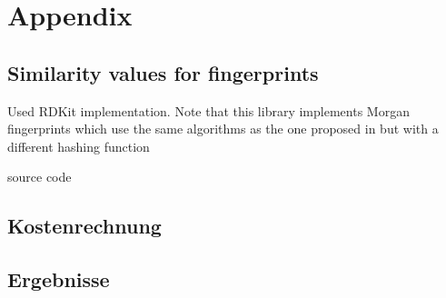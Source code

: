 \appendix
\section*{Appendix}

\subsection{Similarity values for fingerprints}
\label{ch:a_sim}
Used RDKit implementation. Note that this library implements Morgan fingerprints which use the same algorithms as the one proposed in \citep{ECFP} but with a different hashing function

source code


\subsection{Kostenrechnung}
\label{ch:a_kosten}


\subsection{Ergebnisse}
\label{ch:a_erg}